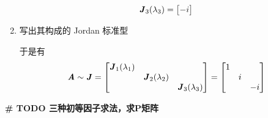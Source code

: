 \begin{solution}
\begin{enumerate}
\begin{align*}
                                \textbf{\textit{J}}_3(\lambda_3) = \begin{bmatrix} -i \end{bmatrix} 
                            \end{align*}
                        \item 写出其构成的 Jordan 标准型
                            \par 于是有
                            \begin{align*}
                                \textbf{\textit{A}} \sim \textbf{\textit{J}} = \begin{bmatrix}
                                    \textbf{\textit{J}}_1(\lambda_1) & & \\ & \textbf{\textit{J}}_2(\lambda_2) & \\ & & \textbf{\textit{J}}_3(\lambda_3)
                                \end{bmatrix} = \begin{bmatrix}
                                    1 & & \\ & i & \\ & & -i
                                \end{bmatrix}
                            \end{align*}
                \end{enumerate}
            \end{solution}

            \textbf{\# TODO 三种初等因子求法，求P矩阵}
